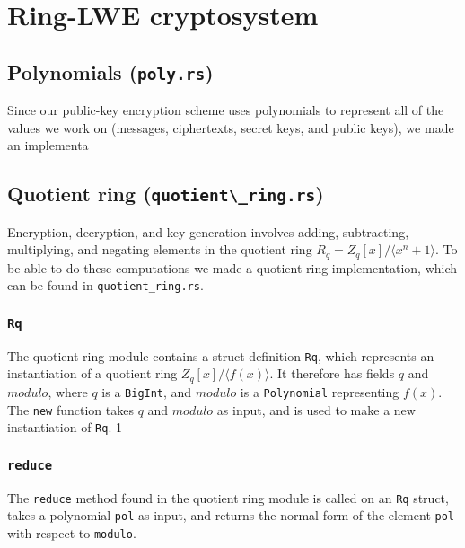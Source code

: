 \documentclass[../main.tex]{subfiles}
\begin{document}
\section{Ring-LWE cryptosystem}
\subsection{Polynomials (\lstinline{poly.rs})}

Since our public-key encryption scheme uses polynomials to represent all of the values we work on (messages, ciphertexts, secret keys, and public keys), we made an implementa 

\subsection{Quotient ring (\lstinline{quotient\_ring.rs})}
Encryption, decryption, and key generation involves adding, subtracting, multiplying, and negating elements in the quotient ring $R_q = Z_q[x]/\langle x^n + 1 \rangle$. To be able to do these computations we made a quotient ring implementation, which can be found in \lstinline{quotient_ring.rs}.

\subsubsection{\lstinline{Rq}}
The quotient ring module contains a struct definition \lstinline{Rq}, which represents an instantiation of a quotient ring $Z_q[x]/\langle f(x) \rangle$. It therefore has fields $q$ and $modulo$, where $q$ is a \lstinline{BigInt}, and $modulo$ is a \lstinline{Polynomial} representing $f(x)$. The \lstinline{new} function takes $q$ and $modulo$ as input, and is used to make a new instantiation of \lstinline{Rq}.
1
\subsubsection{\lstinline{reduce}}
The \lstinline{reduce} method found in the quotient ring module is called on an \lstinline{Rq} struct, takes a polynomial \lstinline{pol} as input, and returns the normal form of the element \lstinline{pol} with respect to \lstinline{modulo}.
\end{document}
